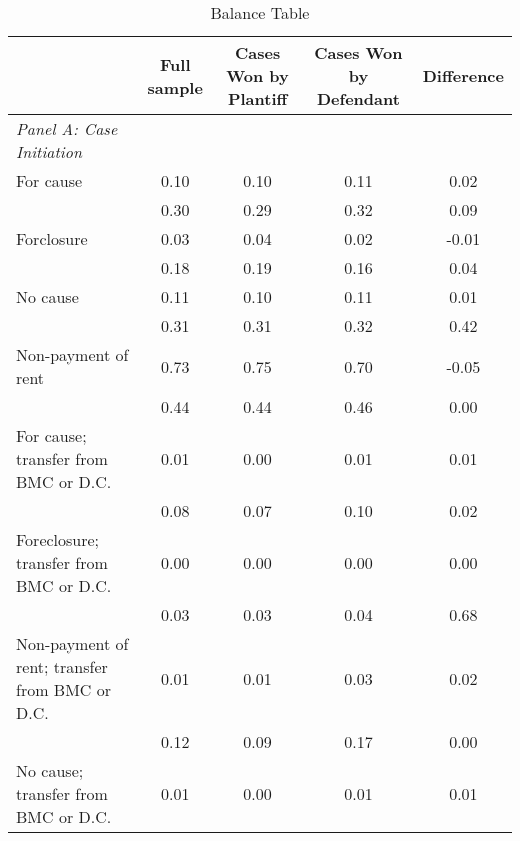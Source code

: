 \begin{table}[htbp]\centering
\def\sym#1{\ifmmode^{#1}\else\(^{#1}\)\fi}
\caption{Balance Table}
\begin{tabular}{l*{4}{c}}
\toprule
                    &\multicolumn{1}{c}{Full sample}&\multicolumn{1}{c}{Cases Won by Plantiff}&\multicolumn{1}{c}{Cases Won by Defendant}&\multicolumn{1}{c}{Difference}\\
\midrule
\emph{Panel A: Case Initiation}&            &            &            &            \\
\hspace{0.25cm}For cause&       0.10 &       0.10 &       0.11 &        0.02\\
                    &       0.30 &       0.29 &       0.32 &        0.09\\
\hspace{0.25cm}Forclosure&       0.03 &       0.04 &       0.02 &       -0.01\\
                    &       0.18 &       0.19 &       0.16 &        0.04\\
\hspace{0.25cm}No cause&       0.11 &       0.10 &       0.11 &        0.01\\
                    &       0.31 &       0.31 &       0.32 &        0.42\\
\hspace{0.25cm}Non-payment of rent&       0.73 &       0.75 &       0.70 &       -0.05\\
                    &       0.44 &       0.44 &       0.46 &        0.00\\
\hspace{0.25cm}For cause; transfer from BMC or D.C.&       0.01 &       0.00 &       0.01 &        0.01\\
                    &       0.08 &       0.07 &       0.10 &        0.02\\
\hspace{0.25cm}Foreclosure; transfer from BMC or D.C.&       0.00 &       0.00 &       0.00 &        0.00\\
                    &       0.03 &       0.03 &       0.04 &        0.68\\
\hspace{0.25cm}Non-payment of rent; transfer from BMC or D.C.&       0.01 &       0.01 &       0.03 &        0.02\\
                    &       0.12 &       0.09 &       0.17 &        0.00\\
\hspace{0.25cm}No cause; transfer from BMC or D.C.&       0.01 &       0.00 &       0.01 &        0.01\\

\end{tabular}
\end{table}
